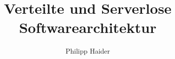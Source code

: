 \documentclass[master,german]{hgbthesis}
\begin{document}

\title{Verteilte und Serverlose Softwarearchitektur}
\author{Philipp Haider}

\frontmatter
\maketitle


\tableofcontents

\mainmatter           %



\MakeBibliography	%


\end{document}
